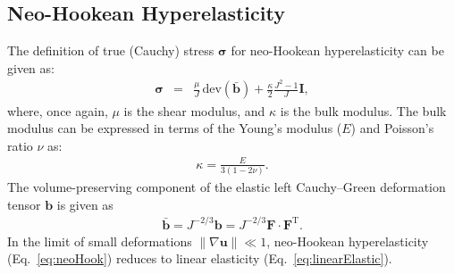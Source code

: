 \documentclass[sn-mathphys,Numbered]{sn-jnl}%
\newcommand{\bb}{\boldsymbol}
\begin{document}
\begin{appendices}
\subsection{Neo-Hookean Hyperelasticity}
\label{app:mechLaws:NH}
%
The definition of true (Cauchy) stress $\bb{\sigma}$ for neo-Hookean hyperelasticity can be given as:
\begin{eqnarray} \label{eq:neoHook}
	\bb{\sigma}
	&=& \frac{\mu}{J} \, \text{dev} \left( \bar{\bb{b}} \right) + \frac{\kappa}{2} \frac{J^2 - 1}{J} \bb{I},
\end{eqnarray}
where, once again, $\mu$ is the shear modulus, and $\kappa$ is the bulk modulus.
The bulk modulus can be expressed in terms of the Young's modulus ($E$) and Poisson's ratio $\nu$ as:
\begin{eqnarray}
	\kappa = \frac{E}{3(1 - 2\nu)}.
\end{eqnarray}
The volume-preserving component of the elastic left Cauchy--Green deformation tensor $\boldsymbol{b}$ is given as
\begin{eqnarray}
	\bar{\bb{b}} = J^{-2/3} \bb{b} = J^{-2/3} \bb{F} \cdot \bb{F}^{\text{T}}.
\end{eqnarray}
In the limit of small deformations $\lVert \nabla \mathbf{u} \rVert  \ll 1$, neo-Hookean hyperelasticity (Eq.~\eqref{eq:neoHook}) reduces to linear elasticity (Eq.~\eqref{eq:linearElastic}).
\iffalse
%

\end{appendices}
\end{document}
